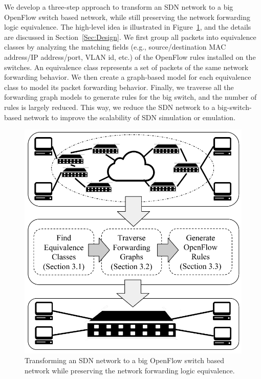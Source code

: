 We develop a three-step approach to transform an SDN network to a big OpenFlow switch based network, while still preserving the network forwarding logic equivalence. The high-level idea is illustrated in Figure~\ref{Fig:BigSimOverview}, and the details are discussed in Section~\ref{Sec:Design}. We first group all packets into equivalence classes by analyzing the matching fields (e.g., source/destination MAC address/IP address/port, VLAN id, etc.) of the OpenFlow rules installed on the switches. An equivalence class represents a set of packets of the same network forwarding behavior. We then create a graph-based model for each equivalence class to model its packet forwarding behavior. Finally, we traverse all the forwarding graph models to generate rules for the big switch, and the number of rules is largely reduced. This way, we reduce the SDN network to a big-switch-based network to improve the scalability of SDN simulation or emulation.

\begin{figure}[t]
\centering
\includegraphics[scale=.6]{figures/BigSimOverview.pdf}
\caption{Transforming an SDN network to a big OpenFlow switch based network while preserving the network forwarding logic equivalence.}
\label{Fig:BigSimOverview}
\end{figure}

